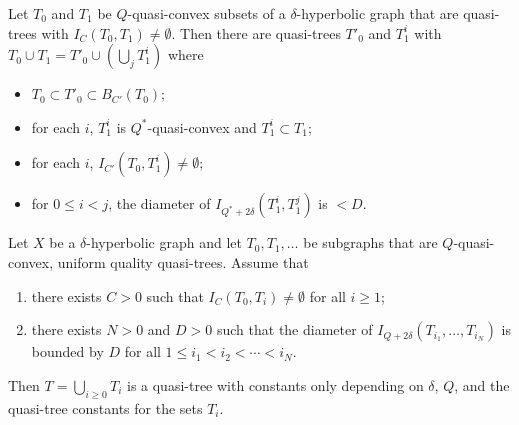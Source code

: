 \documentclass[10pt,a4paper]{amsart}
\begin{document}
\begin{lemma}\label{subtrees}
Let $T_0$ and  $T_1$ be $Q$-quasi-convex subsets of a $\delta$-hyperbolic graph that are quasi-trees with $I_C(T_0, T_1) \neq \emptyset$. Then there are quasi-trees $T'_0$ and $T^i_1$ with 
 $T_0 \cup T_1 = T'_0 \cup \left(\bigcup_j T^i_1\right)$
where
\begin{itemize}
\item $T_0 \subset T'_0\subset B_{C'}(T_0)$;

\item for each $i$, $T_1^i$ is $Q^*$-quasi-convex and $T_1^i \subset T_1$;

\item for each $i$, $I_{C'}(T_0, T^i_1) \neq \emptyset$;

\item for $0\le i<j$, the diameter of $I_{Q^*+2\delta}(T^i_1, T^j_1)$ is $< D$.
\end{itemize}
\end{lemma}

\begin{thm}\label{quasitreelem}
Let $X$ be a $\delta$-hyperbolic graph and let $T_0, T_1,\dots$ be subgraphs that are $Q$-quasi-convex, uniform quality quasi-trees.
Assume that
\begin{enumerate}
\item there exists $C>0$ such that $I_{C}(T_0, T_i) \neq \emptyset$ for all
$i\ge 1$;
\item there exists $N>0$ and $D>0$ such that the diameter of $I_{Q+2\delta}(T_{i_1}, \dots, T_{i_N})$ is bounded by $D$ for all $1\le i_1 < i_2 < \cdots < i_N$.
\end{enumerate}
Then $T = \displaystyle{\bigcup_{i\ge 0}} T_i$ is a quasi-tree with constants only depending on $\delta$, $Q$, and the quasi-tree constants for the sets $T_i$.
\end{thm}
\end{document}
